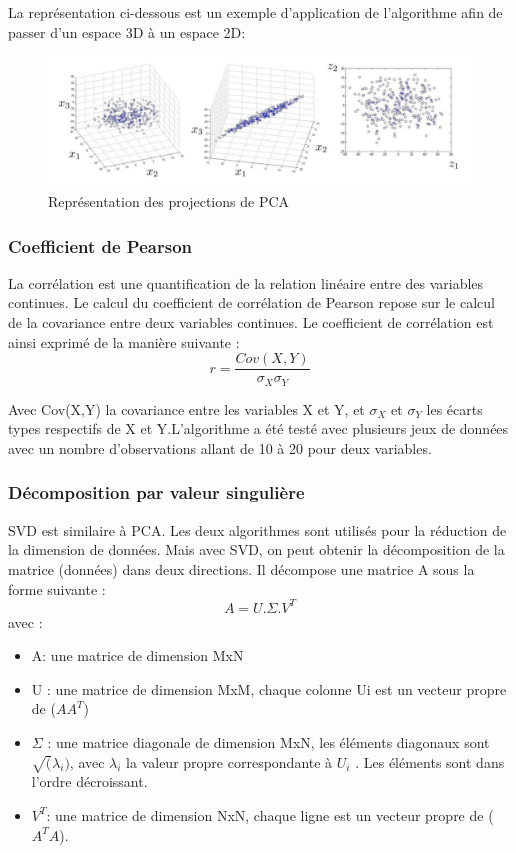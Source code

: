 \documentclass[12pt,a4paper]{article}
\begin{document}
La représentation ci-dessous est un exemple d’application de l’algorithme afin de passer d’un espace 3D à un espace 2D:
\begin{figure}[H]
	\centering
	\includegraphics[width=0.8\linewidth]{soft/screenshot003}
	\caption{Représentation des projections de PCA}
	\label{fig:screenshot003}
\end{figure}
\subsubsection{Coefficient de Pearson}
La corrélation est une quantification de la relation linéaire entre des variables continues. Le calcul du coefficient de corrélation de Pearson repose sur le calcul de la covariance entre deux variables continues. 
Le coefficient de corrélation est ainsi exprimé de la manière suivante :
$$ r = \dfrac{Cov(X,Y)}{\sigma _X \sigma _Y}$$

Avec Cov(X,Y) la covariance entre les variables X et Y, et $\sigma _X$ et $\sigma _Y$ les écarts types respectifs de X et Y.L’algorithme a été testé avec plusieurs jeux de données avec un nombre d’observations allant de 10 à 20 pour deux variables.
\subsubsection{Décomposition par valeur singulière}
SVD est similaire à PCA.  Les deux algorithmes sont utilisés pour la réduction de la dimension de données. Mais avec SVD, on peut obtenir la décomposition de la matrice (données) dans deux directions. Il décompose une matrice A sous la forme suivante :
$$ A = U . \Sigma . V^T$$ 
avec :
\begin{itemize}
\item A: une matrice de dimension MxN
\item U : une matrice de dimension MxM, chaque colonne Ui est un vecteur propre de ($AA^T$)
\item $\Sigma$ : une matrice diagonale de dimension MxN, les éléments diagonaux sont $\sqrt (\lambda_i)$, avec $\lambda_i$ la valeur propre correspondante à $U_i$ . Les éléments sont dans l’ordre décroissant.
\item $V^T$: une matrice de dimension NxN, chaque ligne est un vecteur propre de ($A^TA$).
\end{itemize} 
\end{document}
